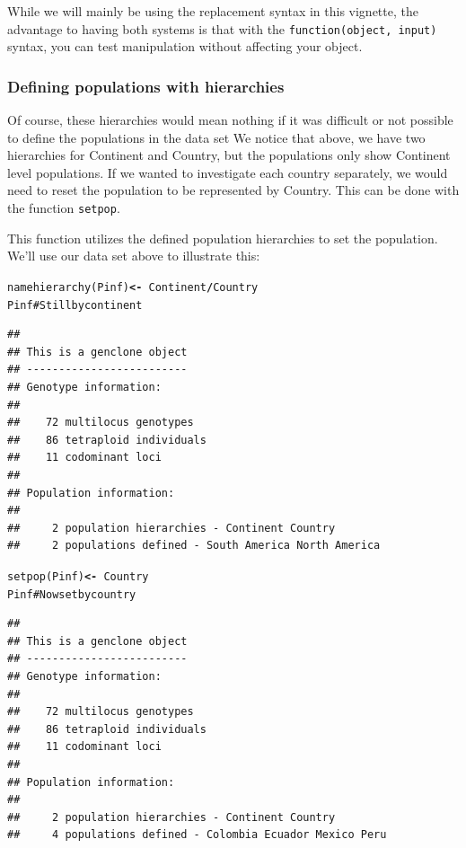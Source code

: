 \documentclass[letterpaper]{article}\usepackage[]{graphicx}\usepackage[]{color}
\makeatletter
\newcommand{\hlcom}[1]{\textcolor[rgb]{1,0.502,0}{#1}}%
\newcommand{\hlopt}[1]{\textcolor[rgb]{1,0,0.502}{\textbf{#1}}}%
\newcommand{\hlstd}[1]{\textcolor[rgb]{0,0,0}{#1}}%
\newcommand{\hlkwb}[1]{\textcolor[rgb]{0.502,0.502,0.753}{\textbf{#1}}}%
\newcommand{\hlkwd}[1]{\textcolor[rgb]{0,0.267,0.4}{#1}}%
\newenvironment{kframe}{%
 \def\at@end@of@kframe{}%
 \ifinner\ifhmode%
  \def\at@end@of@kframe{\end{minipage}}%
  \begin{minipage}{\columnwidth}%
 \fi\fi%
 \def\FrameCommand##1{\hskip\@totalleftmargin \hskip-\fboxsep
 \colorbox{shadecolor}{##1}\hskip-\fboxsep
     \hskip-\linewidth \hskip-\@totalleftmargin \hskip\columnwidth}%
 \MakeFramed {\advance\hsize-\width
   \@totalleftmargin\z@ \linewidth\hsize
   \@setminipage}}%
 {\par\unskip\endMakeFramed%
 \at@end@of@kframe}
\newenvironment{knitrout}{}{} %
\makeatother
\begin{document}
While we will mainly be using the replacement syntax in this vignette, the 
advantage to having both systems is that with the 
\texttt{function(object, input)} syntax, you can test manipulation without 
affecting your object.

\subsubsection{Defining populations with hierarchies}
\label{data.manip:hier:setpop}

Of course, these hierarchies would mean nothing if it was difficult or not
possible to define the populations in the data set We notice that above, we have
two hierarchies for Continent and Country, but the populations only show Continent
level populations. If we wanted to investigate each country separately, we would
need to reset the population to be represented by Country. This can be done with
the function \texttt{setpop}.

This function utilizes the defined population hierarchies to set the population.
We'll use our data set above to illustrate this:

\begin{knitrout}\footnotesize
{}\color{fgcolor}\begin{kframe}
\begin{alltt}
\hlkwd{namehierarchy}\hlstd{(Pinf)} \hlkwb{<-} \hlopt{~}\hlstd{Continent}\hlopt{/}\hlstd{Country}
\hlstd{Pinf}  \hlcom{# Still by continent}
\end{alltt}
\begin{verbatim}
## 
## This is a genclone object
## -------------------------
## Genotype information:
## 
##    72 multilocus genotypes
##    86 tetraploid individuals
##    11 codominant loci
## 
## Population information:
## 
##     2 population hierarchies - Continent Country
##     2 populations defined - South America North America
\end{verbatim}
\begin{alltt}
\hlkwd{setpop}\hlstd{(Pinf)} \hlkwb{<-} \hlopt{~}\hlstd{Country}
\hlstd{Pinf}  \hlcom{# Now set by country}
\end{alltt}
\begin{verbatim}
## 
## This is a genclone object
## -------------------------
## Genotype information:
## 
##    72 multilocus genotypes
##    86 tetraploid individuals
##    11 codominant loci
## 
## Population information:
## 
##     2 population hierarchies - Continent Country
##     4 populations defined - Colombia Ecuador Mexico Peru
\end{verbatim}
\end{kframe}
\end{knitrout}
\end{document}

